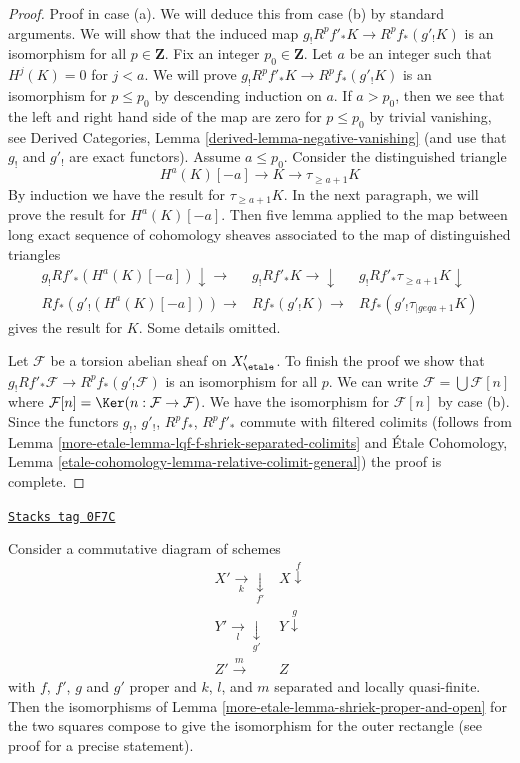 \begin{proof}
\medskip\noindent
Proof in case (a). We will deduce this from case (b) by standard arguments.
We will show that the induced map $g_! R^pf'_* K \to R^pf_*(g'_!K)$
is an isomorphism for all $p \in \mathbf{Z}$. Fix an integer
$p_0 \in \mathbf{Z}$. Let $a$ be an integer such that $H^j(K) = 0$
for $j < a$. We will prove $g_! R^pf'_* K \to R^pf_*(g'_!K)$
is an isomorphism for $p \leq p_0$ by descending induction on $a$. If
$a > p_0$, then we see that the left and right hand side of
the map are zero for $p \leq p_0$ by trivial vanishing, see
Derived Categories, Lemma \ref{derived-lemma-negative-vanishing}
(and use that $g_!$ and $g'_!$ are exact functors).
Assume $a \leq p_0$. Consider the distinguished triangle
$$
H^a(K)[-a] \to K \to \tau_{\geq a + 1}K
$$
By induction we have the result for $\tau_{\geq a + 1}K$.
In the next paragraph, we will prove the result for $H^a(K)[-a]$.
Then five lemma applied to the map between
long exact sequence of cohomology sheaves
associated to the map of distinguished triangles
$$
\begin{array}{ccc}g_! Rf'_*(H^a(K)[-a]) \downarrow\longrightarrow & g_! Rf'_* K \longrightarrow\downarrow & g_! Rf'_* \tau_{\geq a + 1} K \downarrow \\ Rf_*(g'_!(H^a(K)[-a])) \longrightarrow & Rf_*(g'_!K) \longrightarrow & Rf_*(g'_!\tau_{|geq a + 1}K)\end{array}
$$
gives the result for $K$. Some details omitted.

\medskip\noindent
Let $\mathcal{F}$ be a torsion abelian sheaf on $X'_\etale$.
To finish the proof we show that
$g_! Rf'_*\mathcal{F} \to R^pf_*(g'_!\mathcal{F})$
is an isomorphism for all $p$.
We can write $\mathcal{F} = \bigcup \mathcal{F}[n]$ where
$\mathcal{F}[n] = \Ker(n : \mathcal{F} \to \mathcal{F})$.
We have the isomorphism for $\mathcal{F}[n]$ by case (b).
Since the functors $g_!$, $g'_!$, $R^pf_*$, $R^pf'_*$ commute
with filtered colimits (follows from
Lemma \ref{more-etale-lemma-lqf-f-shriek-separated-colimits} and
\'Etale Cohomology, Lemma
\ref{etale-cohomology-lemma-relative-colimit-general})
the proof is complete.
\end{proof}

\begin{lemma}
\label{more-etale-lemma-shriek-proper-and-open-compose}
\href{https://stacks.math.columbia.edu/tag/0F7C}{\texttt{Stacks tag 0F7C}}

Consider a commutative diagram of schemes
$$
\begin{array}{cc}X' \underset{k}{\longrightarrow}\underset{f'}{\downarrow} & X \overset{f}{\downarrow} \\ Y' \underset{l}{\longrightarrow}\underset{g'}{\downarrow} & Y \overset{g}{\downarrow} \\ Z' \overset{m}{\longrightarrow} & Z\end{array}
$$
with $f$, $f'$, $g$ and $g'$ proper and
$k$, $l$, and $m$ separated and locally quasi-finite.
Then the isomorphisms of Lemma \ref{more-etale-lemma-shriek-proper-and-open}
for the two squares compose to give the isomorphism
for the outer rectangle (see proof for a precise statement).
\end{lemma}

